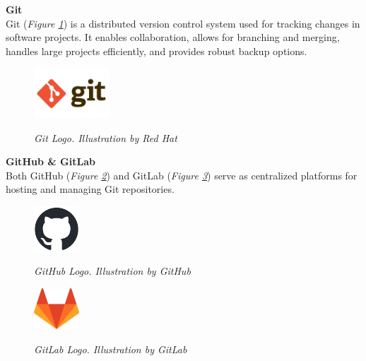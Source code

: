 \vspace{0.5cm}
\textbf{Git} \\

Git (\textit{Figure \ref{fig:git-logo}}) is a distributed version control system used for tracking changes in software projects. It enables collaboration, allows for branching and merging, handles large projects efficiently, and provides robust backup options. 

\begin{figure}[H]
\centering
\begin{adjustbox}{trim=0cm 0.25cm, clip}
\includegraphics[width=0.25\textwidth]{imatges/studies_and_decisions/git-logo.jpg}
\end{adjustbox}
\caption[Git Logo]{\textit{Git Logo. Illustration by Red Hat}}
{\label{fig:git-logo}}
\end{figure}

\vspace{0.5cm}
\textbf{GitHub \& GitLab} \\

Both GitHub (\textit{Figure \ref{fig:github-logo}}) and GitLab (\textit{Figure \ref{fig:gitlab-logo}}) serve as centralized platforms for hosting and managing Git repositories.

\begin{figure}[H]
\centering
\begin{adjustbox}{trim=0cm 0cm, clip}
\includegraphics[width=0.15\textwidth]{imatges/studies_and_decisions/github-mark.png}
\end{adjustbox}
\caption[GitHub Logo]{\textit{GitHub Logo. Illustration by GitHub}}
{\label{fig:github-logo}}
\end{figure}

\begin{figure}[H]
\centering
\begin{adjustbox}{trim=0cm 0cm, clip}
\includegraphics[width=0.15\textwidth]{imatges/studies_and_decisions/gitlab-logo.png}
\end{adjustbox}
\caption[GitLab Logo]{\textit{GitLab Logo. Illustration by GitLab}}
{\label{fig:gitlab-logo}}
\end{figure}

